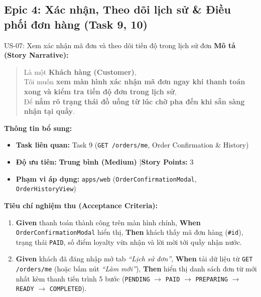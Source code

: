 \documentclass[12pt,a4paper]{article}
\begin{document}
\newpage

\subsection{Epic 4: Xác nhận, Theo dõi lịch sử \& Điều phối đơn hàng (Task 9, 10)}

\begin{userstorybox}{US-07: Xem xác nhận mã đơn và theo dõi tiến độ trong lịch sử đơn}
    \textbf{Mô tả (Story Narrative):}
    \begin{quote}
        Là một \textbf{Khách hàng (Customer)},\\
        Tôi muốn \textbf{xem màn hình xác nhận mã đơn ngay khi thanh toán xong và kiểm tra tiến độ đơn trong lịch sử},\\
        Để \textbf{nắm rõ trạng thái đồ uống từ lúc chờ pha đến khi sẵn sàng nhận tại quầy}.
    \end{quote}

    \textbf{Thông tin bổ sung:}
    \begin{itemize}[noitemsep]
        \item \textbf{Task liên quan:} Task 9 (\texttt{GET /orders/me}, Order Confirmation \& History)
        \item \textbf{Độ ưu tiên:} \textcolor{tagmedium}{\textbf{Trung bình (Medium)}} \quad|\quad \textbf{Story Points:} 3
        \item \textbf{Phạm vi áp dụng:} \texttt{apps/web} (\texttt{OrderConfirmationModal}, \texttt{OrderHistoryView})
    \end{itemize}

    \textbf{Tiêu chí nghiệm thu (Acceptance Criteria):}
    \begin{enumerate}[noitemsep]
        \item \textbf{Given} thanh toán thành công trên màn hình chính, \textbf{When} \texttt{OrderConfirmationModal} hiển thị, \textbf{Then} khách thấy mã đơn hàng (\texttt{\#id}), trạng thái \texttt{PAID}, số điểm loyalty vừa nhận và lời mời tới quầy nhận nước.
        \item \textbf{Given} khách đã đăng nhập mở tab \textit{``Lịch sử đơn''}, \textbf{When} tải dữ liệu từ \texttt{GET /orders/me} (hoặc bấm nút \textit{``Làm mới''}), \textbf{Then} hiển thị danh sách đơn từ mới nhất kèm thanh tiến trình 5 bước (\texttt{PENDING} $\rightarrow$ \texttt{PAID} $\rightarrow$ \texttt{PREPARING} $\rightarrow$ \texttt{READY} $\rightarrow$ \texttt{COMPLETED}).
    \end{enumerate}
\end{userstorybox}
\end{document}
